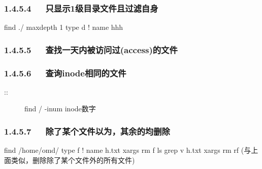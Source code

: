 \documentclass[letterpaper,12pt,english]{sphinxmanual}
\begin{document}
\subsubsection{1.4.5.4   只显示1级目录文件且过滤自身}
\label{\detokenize{001software/001install/linux:id10}}
\begin{sphinxVerbatim}[commandchars=\\\{\}]
find ./ \PYGZhy{}maxdepth 1  \PYGZhy{}type d  ! \PYGZhy{}name \PYGZdq{}hhh\PYGZdq{}
\end{sphinxVerbatim}


\subsubsection{1.4.5.5   查找一天内被访问过(access)的文件}
\label{\detokenize{001software/001install/linux:access}}
\begin{sphinxVerbatim}[commandchars=\\\{\}]
     
\end{sphinxVerbatim}


\subsubsection{1.4.5.6   查询inode相同的文件}
\label{\detokenize{001software/001install/linux:inode}}\begin{description}
\item[{::}] \leavevmode
find / -inum inode数字

\end{description}


\subsubsection{1.4.5.7   除了某个文件以为，其余的均删除}
\label{\detokenize{001software/001install/linux:id11}}
\begin{sphinxVerbatim}[commandchars=\\\{\}]
find /home/omd/ \PYGZhy{}type f ! \PYGZhy{}name h.txt  \textbar{} xargs  rm \textendash{}f
ls \textbar{} grep \PYGZhy{}v \PYGZdq{}h.txt\PYGZdq{} \textbar{}xargs rm \PYGZhy{}rf (与上面类似，删除除了某个文件外的所有文件)
\end{sphinxVerbatim}
\end{document}
